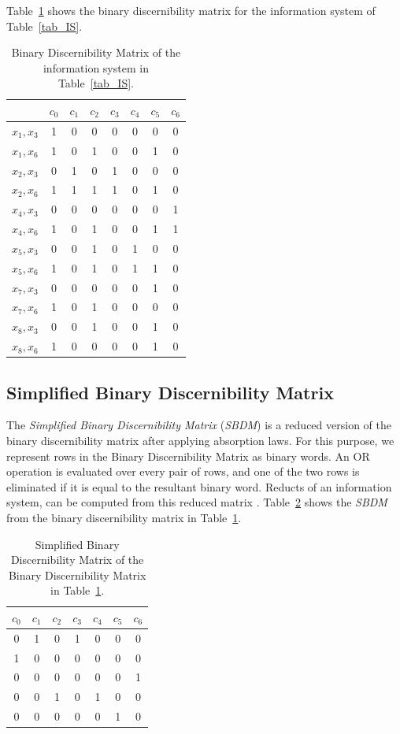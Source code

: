 \documentclass[number,preprint,review,12pt]{elsarticle}
\begin{document}
  Table~\ref{tab_BDM} shows the binary discernibility matrix for the information system of Table~\ref{tab_IS}.  
  
  \begin{table}[htb]
		\caption{Binary Discernibility Matrix of the information system in Table~\ref{tab_IS}.} \label{tab_BDM}
		\centering
 	\begin{tabular}{c|ccccccc}
 		& $c_0$ & $c_1$ & $c_2$ & $c_3$ & $c_4$ & $c_5$ & $c_6$\\
 		\hline
		$x_1,x_3$ & 1 & 0 & 0 & 0 & 0 & 0 & 0 \\
		$x_1,x_6$ & 1 & 0 & 1 & 0 & 0 & 1 & 0 \\
		$x_2,x_3$ & 0 & 1 & 0 & 1 & 0 & 0 & 0 \\
		$x_2,x_6$ & 1 & 1 & 1 & 1 & 0 & 1 & 0 \\
		$x_4,x_3$ & 0 & 0 & 0 & 0 & 0 & 0 & 1 \\
		$x_4,x_6$ & 1 & 0 & 1 & 0 & 0 & 1 & 1 \\
		$x_5,x_3$ & 0 & 0 & 1 & 0 & 1 & 0 & 0 \\
		$x_5,x_6$ & 1 & 0 & 1 & 0 & 1 & 1 & 0 \\
		$x_7,x_3$ & 0 & 0 & 0 & 0 & 0 & 1 & 0 \\
		$x_7,x_6$ & 1 & 0 & 1 & 0 & 0 & 0 & 0 \\
		$x_8,x_3$ & 0 & 0 & 1 & 0 & 0 & 1 & 0 \\
		$x_8,x_6$ & 1 & 0 & 0 & 0 & 0 & 1 & 0 
 	\end{tabular}             
  \end{table}

\subsection{Simplified Binary Discernibility Matrix}\label{sect_SBDM}
  The \textit{Simplified Binary Discernibility Matrix} (\textit{SBDM}) is a reduced version of the binary discernibility matrix after applying absorption laws. For this purpose, we represent rows in the Binary Discernibility Matrix as binary words. An OR operation is evaluated over every pair of rows, and one of the two rows is eliminated if it is equal to the resultant binary word. Reducts of an information system, can be computed from this reduced matrix \citep{Yao09}. Table~\ref{tab:SBDM1} shows the \textit{SBDM} from the binary discernibility matrix in Table~\ref{tab_BDM}.
  
     \begin{table}[htb]
		\caption{Simplified Binary Discernibility Matrix of the Binary Discernibility Matrix in Table~\ref{tab_BDM}.}
		\centering
 	\begin{tabular}{ccccccc}\label{tab:SBDM1}
            $c_0$ & $c_1$ & $c_2$ & $c_3$ & $c_4$ & $c_5$ & $c_6$\\
        		\hline
        		0&1&0&1&0&0&0\\
        		1&0&0&0&0&0&0\\
        		0&0&0&0&0&0&1\\
        		0&0&1&0&1&0&0\\
        		0&0&0&0&0&1&0\\
 	\end{tabular}             
 \end{table}  
 
\end{document}
